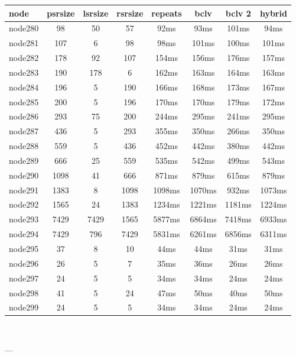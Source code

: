 \begin{tabular}{|l|c|c|c|c|c|c|c|}
\hline node & psrsize & lsrsize & rsrsize   & repeats & bclv & bclv 2 & hybrid\\
    \hline node280 & 98 & 50 & 57 & 92ms & 93ms & 101ms & 94ms\\
    \hline node281 & 107 & 6 & 98 & 98ms & 101ms & 100ms & 101ms\\
    \hline node282 & 178 & 92 & 107 & 154ms & 156ms & 176ms & 157ms\\
    \hline node283 & 190 & 178 & 6 & 162ms & 163ms & 164ms & 163ms\\
    \hline node284 & 196 & 5 & 190 & 166ms & 168ms & 173ms & 167ms\\
    \hline node285 & 200 & 5 & 196 & 170ms & 170ms & 179ms & 172ms\\
    \hline node286 & 293 & 75 & 200 & 244ms & 295ms & 241ms & 295ms\\
    \hline node287 & 436 & 5 & 293 & 355ms & 350ms & 266ms & 350ms\\
    \hline node288 & 559 & 5 & 436 & 452ms & 442ms & 380ms & 442ms\\
    \hline node289 & 666 & 25 & 559 & 535ms & 542ms & 499ms & 543ms\\
    \hline node290 & 1098 & 41 & 666 & 871ms & 879ms & 615ms & 879ms\\
    \hline node291 & 1383 & 8 & 1098 & 1098ms & 1070ms & 932ms & 1073ms\\
    \hline node292 & 1565 & 24 & 1383 & 1234ms & 1221ms & 1181ms & 1224ms\\
    \hline node293 & 7429 & 7429 & 1565 & 5877ms & 6864ms & 7418ms & 6933ms\\
    \hline node294 & 7429 & 796 & 7429 & 5831ms & 6261ms & 6856ms & 6311ms\\
    \hline node295 & 37 & 8 & 10 & 44ms & 44ms & 31ms & 31ms\\
    \hline node296 & 26 & 5 & 7 & 35ms & 36ms & 26ms & 26ms\\
    \hline node297 & 24 & 5 & 5 & 34ms & 34ms & 24ms & 24ms\\
    \hline node298 & 41 & 5 & 24 & 47ms & 50ms & 40ms & 50ms\\
    \hline node299 & 24 & 5 & 5 & 34ms & 34ms & 24ms & 24ms\\

\hline
\end{tabular} \

---


